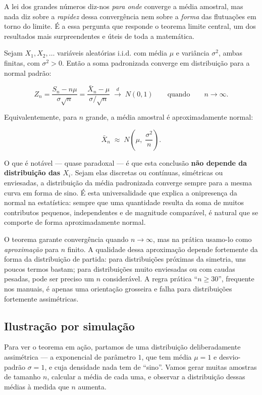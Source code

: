 \documentclass[
  portuguese,
  11pt,
  openany]{book}
\begin{document}
A lei dos grandes números diz-nos \emph{para onde} converge a média amostral, mas
nada diz sobre a \emph{rapidez} dessa convergência nem sobre a \emph{forma} das flutuações
em torno do limite. É a essa pergunta que responde o teorema limite central, um
dos resultados mais surpreendentes e úteis de toda a matemática.

Sejam \(X_1, X_2, \ldots\) variáveis aleatórias i.i.d. com média \(\mu\) e variância
\(\sigma^2\), ambas finitas, com \(\sigma^2 > 0\). Então a soma padronizada
converge em distribuição para a normal padrão:

\[
Z_n = \frac{S_n - n\mu}{\sigma\sqrt{n}}
     = \frac{\bar{X}_n - \mu}{\sigma/\sqrt{n}}
     \;\xrightarrow{d}\; N(0, 1)
\qquad \text{quando} \qquad n \to \infty.
\]

Equivalentemente, para \(n\) grande, a média amostral é aproximadamente normal:

\[
\bar{X}_n \;\approx\; N\!\left(\mu,\; \frac{\sigma^2}{n}\right).
\]

O que é notável --- quase paradoxal --- é que esta conclusão \textbf{não depende da
distribuição das \(X_i\)}. Sejam elas discretas ou contínuas, simétricas ou
enviesadas, a distribuição da média padronizada converge sempre para a mesma
curva em forma de sino. É esta universalidade que explica a onipresença da
normal na estatística: sempre que uma quantidade resulta da soma de muitos
contributos pequenos, independentes e de magnitude comparável, é natural que se
comporte de forma aproximadamente normal.

O teorema garante convergência quando \(n \to \infty\), mas na prática usamo-lo
como \emph{aproximação} para \(n\) finito. A qualidade dessa aproximação depende
fortemente da forma da distribuição de partida: para distribuições próximas da
simetria, uns poucos termos bastam; para distribuições muito enviesadas ou com
caudas pesadas, pode ser preciso um \(n\) considerável. A regra prática
``\(n \geq 30\)'', frequente nos manuais, é apenas uma orientação grosseira e falha
para distribuições fortemente assimétricas.

\subsection{Ilustração por simulação}\label{ilustrauxe7uxe3o-por-simulauxe7uxe3o-1}

Para ver o teorema em ação, partamos de uma distribuição deliberadamente
assimétrica --- a exponencial de parâmetro \(1\), que tem média \(\mu = 1\) e
desvio-padrão \(\sigma = 1\), e cuja densidade nada tem de ``sino''. Vamos gerar
muitas amostras de tamanho \(n\), calcular a média de cada uma, e observar a
distribuição dessas médias à medida que \(n\) aumenta.
\end{document}
